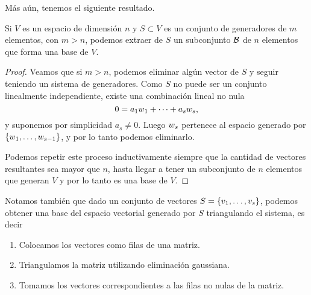 M\'as a\'un, tenemos el siguiente resultado.

\begin{proposicion} \label{prop:subbase}
Si $V$ es un espacio de dimensi\'on $n$ y $S \subset V$ es un conjunto de generadores de $m$ elementos, con $m > n$, podemos extraer de $S$ un subconjunto $\mathcal B$ de $n$ elementos que forma una base de $V$.
\end{proposicion}

\begin{proof}
Veamos que si $m > n$, podemos eliminar alg\'un vector de $S$ y seguir teniendo un sistema de generadores.
Como $S$ no puede ser un conjunto linealmente independiente, existe una combinación lineal no nula
$$
0 = a_1 \wb_1 + \dots + a_s \wb_s,
$$
y suponemos por simplicidad $a_s \neq 0$. Luego $\wb_s$ pertenece al espacio generado por $\{\wb_1, \dots, \wb_{s-1}\}$, y por lo tanto podemos eliminarlo.

Podemos repetir este proceso inductivamente siempre que la cantidad de vectores resultantes sea mayor que $n$, hasta llegar a tener un subconjunto de $n$ elementos que generan $V$ y por lo tanto es una base de $V$.
\end{proof}

Notamos también que dado un conjunto de vectores $S = \{\vb_1, \dots, \vb_s\}$, podemos obtener una base del espacio vectorial generado por $S$ triangulando el sistema, es decir
\begin{enumerate}
\item Colocamos los vectores como filas de una matriz.
\item Triangulamos la matriz utilizando eliminación gaussiana.
\item Tomamos los vectores correspondientes a las filas no nulas de la matriz.
\end{enumerate}

